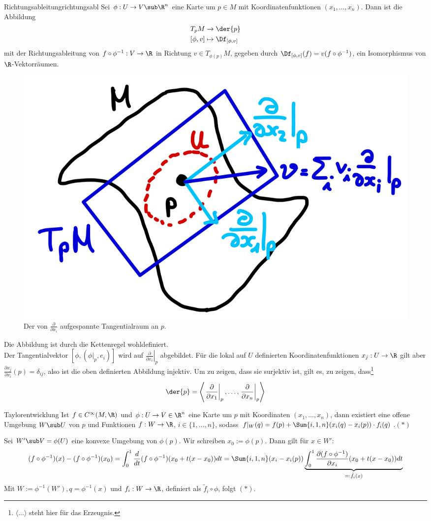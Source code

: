 \begin{satz}{Richtungsableitung}{richtungsabl}
Sei $\phi: U \to V \sub \R^n$ eine Karte um $p \in M$ mit Koordinatenfunktionen $(x_1, \dots, x_n)$. Dann ist die Abbildung 
\begin{align}
T_pM &\to \der{p} \\
[\phi, v] &\mapsto \Df_{[\phi, v]}
\end{align}
mit der Richtungsableitung von $f \circ \phi^{-1}: V \to \R$ in Richtung $v \in T_{\phi(p)}M$, gegeben durch $\Df_{[\phi, v]}(f) = v (f \circ \phi^{-1})$, ein Isomorphismus von $\R$-Vektorräumen.
\begin{figure}[H]
\label{fig:tangentialvek3}
\centering
\includegraphics[width=0.2\linewidth]{Bilder/tangentialvek3.png}
\caption{Der von $\frac{\partial}{\partial x_i}$ aufgespannte Tangentialraum an $p$.}
\end{figure}
\end{satz}
\begin{beweis}
Die Abbildung ist durch die Kettenregel wohldefiniert.\\
Der Tangentialvektor $[\phi, (\phi|_p, e_i)]$ wird auf $\left.\frac{\partial}{\partial x_i}\right|_p$ abgebildet. Für die lokal auf $U$ definierten Koordinatenfunktionen $x_j: U \to \R$ gilt aber $\frac{\partial x_j}{\partial x_i} (p) = \delta_{ij}$, also ist die oben definierten Abbildung injektiv. Um zu zeigen, dass sie surjektiv ist, gilt es, zu zeigen, dass\footnote{$\langle \dots \rangle$ steht hier für das Erzeugnis.}
\begin{equation}
\der{p} = \left\langle \left. \frac{\partial}{\partial x_1}\right|_p, \dots, \left. \frac{\partial}{\partial x_n}\right|_p \right\rangle
\end{equation}
\let\qed\relax
\end{beweis}
\begin{lemma}{Taylorentwicklung}{}
Ist $f \in C^\infty (M, \R)$ und $\phi: U \to V \in \R^n$ eine Karte um $p$ mit Koordinaten $(x_1, \dots, x_n)$, dann existiert eine offene Umgebung $W \sub U$ von $p$ und Funktionen $f: W \to \R$, $i \in \{1, \dots, n \}$, sodass $f|_W (q) = f(p) + \Sum{i,1,n} (x_i(q)-x_i(p)) \cdot f_i(q)$.$(\ast)$
\end{lemma}
\begin{beweis}
Sei $W' \sub V = \phi(U)$ eine konvexe Umgebung von $\phi(p)$. Wir schreiben $x_0 := \phi(p)$. Dann gilt für $x \in W'$:
\begin{equation}
(f \circ \phi^{-1})(x)-(f \circ \phi^{-1})(x_0) = \int_0^1 \frac{d}{dt} (f \circ \phi^{-1})(x_0 + t(x-x_0)) dt = \Sum{i,1,n} (x_i - x_i(p)) \underbrace{\int_0^1 \frac{\partial(f \circ \phi^{-1})}{\partial x_i}(x_0 + t(x-x_0))dt}_{=:\tilde{f}_i(x)}
\end{equation}
Mit $W:= \phi^{-1}(W'), q= \phi^{-1}(x)$ und $f_i: W \to \R$, definiert als $\tilde{f}_i \circ \phi$, folgt $(\ast)$. 
\end{beweis}
